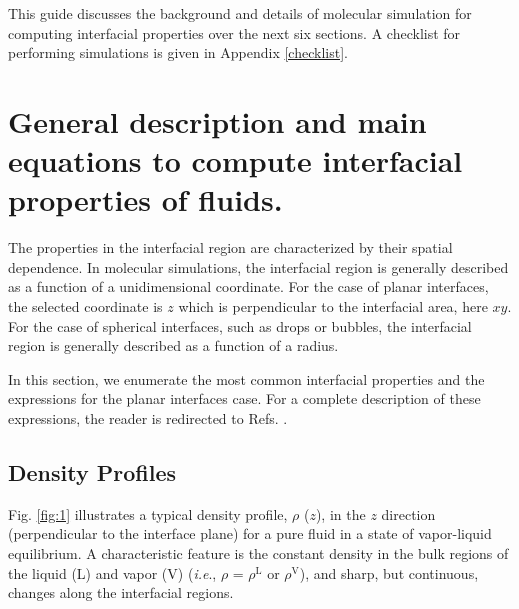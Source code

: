 \documentclass[9pt,tutorial]{livecoms}
\begin{document}
This guide discusses the background and details of molecular simulation for computing interfacial properties over the next six sections. A checklist for performing simulations is given in Appendix \ref{checklist}.

\section{General description and main equations to compute interfacial properties of fluids.}

The properties in the interfacial region are characterized by their spatial
dependence. In molecular simulations, the interfacial region is generally
described as a function of a unidimensional coordinate. For the case of planar
interfaces, the selected coordinate is $z$ which is perpendicular to the
interfacial area, here $xy$. For the case of spherical interfaces, such
as drops or bubbles, the interfacial region is generally described as
a function of a radius.

In this section, we enumerate the most common interfacial properties and the
expressions for the planar interfaces case. For a complete description of
these expressions, the reader is redirected to Refs. \citep{allen2017,gray2011}.

\subsection{Density Profiles}

Fig. \ref{fig:1} illustrates a typical density profile, ${\rho}$ ($z$), in the
$z$ direction (perpendicular to the interface plane) for a pure fluid
in a state of vapor-liquid equilibrium. A characteristic feature is the
constant density in the bulk regions of the liquid (L) and vapor (V)
(\textit{i.e}., ${\rho}$ = ${\rho}^{\mathrm{L}}$ or ${\rho}^{\mathrm{V}}$),
and  sharp, but continuous, changes along the interfacial regions. 
\end{document}
